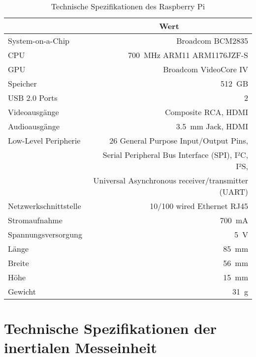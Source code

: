 \begin{table}[ht]
\caption{Technische Spezifikationen des Raspberry Pi}
\begin{center}
\begin{tabular}{|l|r|}
\hline
\rowcolor{lightgray} \multicolumn{1}{|c|}{\textbf{Spezifikation}} & \multicolumn{1}{|c|}{\textbf{Wert}}\\
\hline
System-on-a-Chip & Broadcom BCM2835\\
\hline
CPU & \SI{700}{\mega\Hz} ARM11 ARM1176JZF-S\\
\hline
GPU & Broadcom VideoCore IV\\
\hline
Speicher & \SI{512}{GB}\\
\hline
USB 2.0 Ports & \SI{2}{}\\
\hline
Videoausgänge & Composite RCA, HDMI\\
\hline
Audioausgänge & \SI{3,5}{\milli\meter} Jack, HDMI\\
\hline
Low-Level Peripherie & \SI{26}{} General Purpose Input/Output Pins,\\
& Serial Peripheral Bus Interface (SPI), I²C, I²S,\\
& Universal Asynchronous receiver/transmitter (UART)\\
\hline
Netzwerkschnittstelle & \SI{10}{}/\SI{100}{} wired Ethernet RJ45\\
\hline
Stromaufnahme & \SI{700}{\milli\ampere}\\
\hline
Spannungsversorgung & \SI{5}{\volt}\\
\hline
Länge & \SI{85}{\milli\meter}\\
\hline
Breite & \SI{56}{\milli\meter}\\
\hline
Höhe & \SI{15}{\milli\meter}\\
\hline
Gewicht & \SI{31}{\gram}\\
\hline
\end{tabular}
\end{center}
\label{tab:raspberry}
\end{table}

\clearpage{}

\section{Technische Spezifikationen der inertialen Messeinheit}
\label{app.imu}

